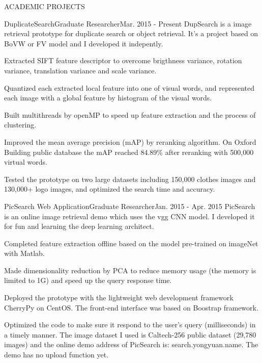 \documentclass{resume} %
\begin{document}

\begin{rSection}{ACADEMIC PROJECTS}

\begin{pSubsection}{DuplicateSearch}{Graduate Researcher}{Mar. 2015 - Present}
{DupSearch is a image retrieval prototype for duplicate search or object retrieval. It's a project based on BoVW or FV model and I developed it indepently.}
\item Extracted SIFT feature descriptor to overcome brigthness variance, rotation variance, translation variance and scale variance.
\item Quantized each extracted local feature into one of visual words, and represented each image with a global feature by histogram of the visual words.
\item Built multithreads by openMP to speed up feature extraction and the process of clustering.
\item Improved the mean average precision (mAP) by reranking algorithm. On Oxford Building public database the mAP reached 84.89\% after reranking with 500,000 virtual words.
\item Tested the prototype on two large datasets including 150,000 clothes images and 130,000+ logo images, and optimized the search time and accuracy.
\end{pSubsection}
\vspace{-0.5em}


\begin{pSubsection}{PicSearch Web Application}{Graduate Researcher}{Jan. 2015 - Apr. 2015}
{PicSearch is an online image retrieval demo which uses the vgg CNN model. I developed it for fun and learning the deep learning architect.}
\item Completed feature extraction offline based on the model pre-trained on imageNet with Matlab.
\item Made dimensionality reduction by PCA to reduce memory usage (the memory is limited to 1G) and speed up the query response time.
\item Deployed the prototype with the lightweight web development framework CherryPy on CentOS. The front-end interface was based on Boostrap framework.
\item Optimized the code to make sure it respond to the user's query (milliseconds) in a timely manner. The image dataset I used is Caltech-256 public dataset (29,780 images) and the online demo address of PicSearch is: search.yongyuan.name. The demo has no upload function yet.
\end{pSubsection}
\vspace{-0.5em}


\end{rSection}
\end{document}
